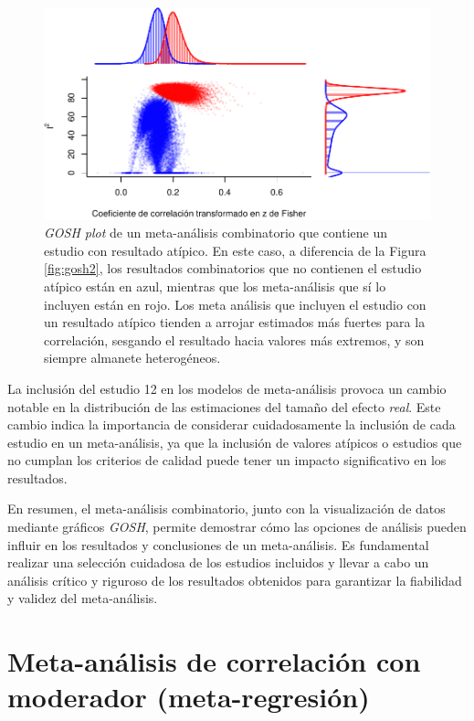 \documentclass[
  bookmarksnumbered]{article}
\begin{document}
\begin{figure}
\centering
\includegraphics{Meta-analysis_files/figure-latex/gosh3-1.pdf}
\caption{\label{fig:gosh3}\emph{GOSH plot} de un meta-análisis combinatorio que contiene un estudio con resultado atípico. En este caso, a diferencia de la Figura \ref{fig:gosh2}, los resultados combinatorios que no contienen el estudio atípico están en azul, mientras que los meta-análisis que sí lo incluyen están en rojo. Los meta análisis que incluyen el estudio con un resultado atípico tienden a arrojar estimados más fuertes para la correlación, sesgando el resultado hacia valores más extremos, y son siempre almanete heterogéneos.}
\end{figure}

La inclusión del estudio 12 en los modelos de meta-análisis provoca un cambio notable en la distribución de las estimaciones del tamaño del efecto \emph{real}. Este cambio indica la importancia de considerar cuidadosamente la inclusión de cada estudio en un meta-análisis, ya que la inclusión de valores atípicos o estudios que no cumplan los criterios de calidad puede tener un impacto significativo en los resultados.

En resumen, el meta-análisis combinatorio, junto con la visualización de datos mediante gráficos \emph{GOSH}, permite demostrar cómo las opciones de análisis pueden influir en los resultados y conclusiones de un meta-análisis. Es fundamental realizar una selección cuidadosa de los estudios incluidos y llevar a cabo un análisis crítico y riguroso de los resultados obtenidos para garantizar la fiabilidad y validez del meta-análisis.

\hypertarget{met-moderation}{%
\section{Meta-análisis de correlación con moderador (meta-regresión)}\label{met-moderation}}
\end{document}
